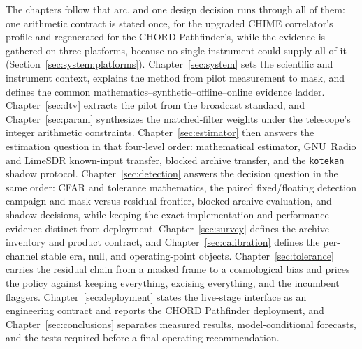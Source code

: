 The chapters follow that arc, and one design decision runs through all of them: one arithmetic contract is stated once, for the upgraded CHIME correlator's profile and regenerated for the CHORD Pathfinder's, while the evidence is gathered on three platforms, because no single instrument could supply all of it (Section~\ref{sec:system:platforms}). Chapter~\ref{sec:system} sets the scientific and instrument context, explains the method from pilot measurement to mask, and defines the common mathematics--synthetic--offline--online evidence ladder. Chapter~\ref{sec:dtv} extracts the pilot from the broadcast standard, and Chapter~\ref{sec:param} synthesizes the matched-filter weights under the telescope's integer arithmetic constraints. Chapter~\ref{sec:estimator} then answers the estimation question in that four-level order: mathematical estimator, GNU~Radio and LimeSDR known-input transfer, blocked archive transfer, and the \texttt{kotekan} shadow protocol. Chapter~\ref{sec:detection} answers the decision question in the same order: CFAR and tolerance mathematics, the paired fixed/floating detection campaign and mask-versus-residual frontier, blocked archive evaluation, and shadow decisions, while keeping the exact implementation and performance evidence distinct from deployment. Chapter~\ref{sec:survey} defines the archive inventory and product contract, and Chapter~\ref{sec:calibration} defines the per-channel stable era, null, and operating-point objects. Chapter~\ref{sec:tolerance} carries the residual chain from a masked frame to a cosmological bias and prices the policy against keeping everything, excising everything, and the incumbent flaggers. Chapter~\ref{sec:deployment} states the live-stage interface as an engineering contract and reports the CHORD Pathfinder deployment, and Chapter~\ref{sec:conclusions} separates measured results, model-conditional forecasts, and the tests required before a final operating recommendation.
